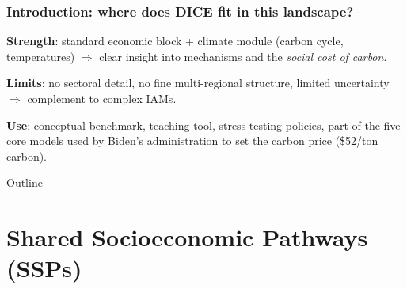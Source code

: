 \documentclass[xcolor=x11names,compress,aspectratio=169]{beamer}%
\makeatletter
\renewenvironment{itemize}{\begin{compactitemize}[<+-| alert@+>]}{\end{compactitemize}}
\makeatother
\begin{document}
\begin{frame}%
%

\frametitle{Introduction: where does DICE fit in this landscape?}%


\begin{itemize}
\item \textbf{Strength}: standard economic block + climate module (carbon
cycle, temperatures) $\Rightarrow$ clear insight into mechanisms and the
\emph{social cost of carbon}.%
\vspace{2ex}%


\item \textbf{Limits}: no sectoral detail, no fine multi-regional structure,
limited uncertainty $\Rightarrow$ complement to complex IAMs.%
\vspace{2ex}%


\item \textbf{Use}: conceptual benchmark, teaching tool, stress-testing
policies, part of the five core models used by Biden's administration to set
the carbon price (\$52/ton carbon).
\end{itemize}

%

\transboxout
\end{frame}%
%

\begin{frame}{Outline}
\tableofcontents\end{frame}%


\section{Shared Socioeconomic Pathways (SSPs)}%
\end{document}

